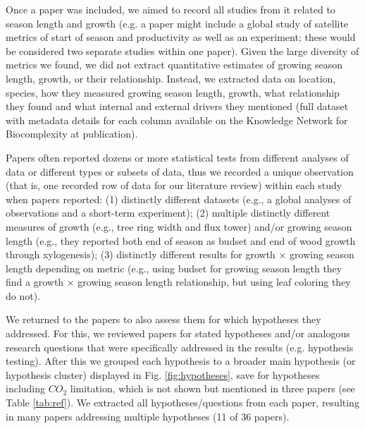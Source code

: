 \documentclass[11pt]{article}
\begin{document}
Once a paper was included, we aimed to record all studies from it related to season length and growth (e.g. a paper might include a global study of satellite metrics of start of season and productivity as well as an experiment; these would be considered two separate studies within one paper). Given the large diversity of metrics we found, we did not extract quantitative estimates of growing season length, growth, or their relationship. Instead, we extracted data on location, species, how they measured growing season length, growth, what relationship they found and what internal and external drivers they mentioned (full dataset with metadata details for each column available on the Knowledge Network for Biocomplexity at publication). 

Papers often reported dozens or more statistical tests from different analyses of data or different types or subsets of data, thus we recorded a unique observation (that is, one recorded row of data for our literature review) within each study when papers reported: (1) distinctly different datasets (e.g., a global analyses of observations and a short-term experiment); (2) multiple distinctly different measures of growth (e.g., tree ring width and flux tower) and/or growing season length (e.g., they reported both end of season as budset and end of wood growth through xylogenesis); (3) distinctly different results for growth $\times$  growing season length depending on metric (e.g., using budset for growing season length they find a growth $\times$ growing season length relationship, but using leaf coloring they do not). %

We returned to the papers to also assess them for which hypotheses they addressed. For this, we reviewed papers for stated hypotheses and/or analogous research questions that were specifically addressed in the results (e.g. hypothesis testing).  After this we grouped each hypothesis to a broader main hypothesis (or hypothesis cluster) displayed in Fig. \ref{fig:hypotheses}, save for hypotheses including $CO_2$ limitation, which is not shown but mentioned in three papers (see Table \ref{tab:ref}). We extracted all hypotheses/questions from each paper, resulting in many papers addressing multiple hypotheses (11 of 36 papers). 
\end{document}
